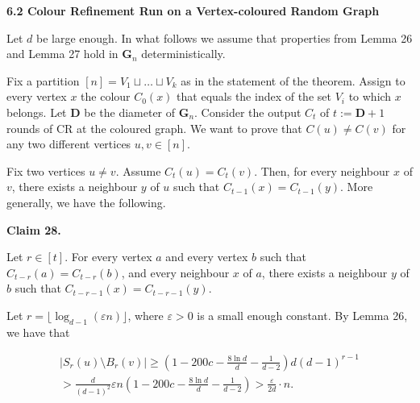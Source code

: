 \par\medskip\noindent\textbf{
6.2 Colour Refinement Run on a Vertex-coloured Random Graph}\par




Let $d$ be large enough. In what follows we assume that properties from Lemma 26 and Lemma 27 hold in $\mathbf{G}_{n}$ deterministically.\par




Fix a partition $[n]=V_{1}\sqcup\ldots\sqcup V_{k}$ as in the statement of the theorem. Assign to every vertex $x$ the colour $C_{0}(x)$ that equals the index of the set $V_{i}$ to which $x$ belongs. Let $\mathbf{D}$ be the diameter of $\mathbf{G}_{n}$. Consider the output $C_{t}$ of $t:=\mathbf{D}+1$ rounds of CR at the coloured graph. We want to prove that $C(u)\neq C(v)$ for any two different vertices $u,v\in[n]$.\par




Fix two vertices $u\neq v$. Assume $C_{t}(u)=C_{t}(v)$. Then, for every neighbour $x$ of $v$, there exists a neighbour $y$ of $u$ such that $C_{t-1}(x)=C_{t-1}(y)$. More generally, we have the following.\par





\par\medskip\noindent\textbf{
Claim 28. 
}\par



Let $r\in[t]$. For every vertex $a$ and every vertex $b$ such that $C_{t-r}(a)=C_{t-r}(b)$, and every neighbour $x$ of $a$, there exists a neighbour $y$ of $b$ such that $C_{t-r-1}(x)=C_{t-r-1}(y)$.\par






Let $r=\lfloor\log_{d-1}(\varepsilon n)\rfloor$, where $\varepsilon>0$ is a small enough constant. By Lemma 26, we have that\par


\[\begin{gathered}
\displaystyle|S_{r}(u)\setminus B_{r}(v)| \displaystyle\geq\left(1-200c-\frac{8\ln d}{d}-\frac{1}{d-2}\right)d(d-1)^{r-1} \\
\displaystyle>\frac{d}{(d-1)^{2}}\varepsilon n\left(1-200c-\frac{8\ln d}{d}-\frac{1}{d-2}\right)>\frac{\varepsilon}{2d}\cdot n.
\end{gathered}\]




